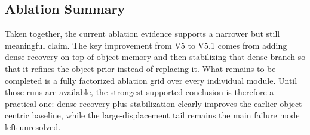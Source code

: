 \subsection{Ablation Summary}

Taken together, the current ablation evidence supports a narrower but still meaningful claim. The key improvement from V5 to V5.1 comes from adding dense recovery on top of object memory and then stabilizing that dense branch so that it refines the object prior instead of replacing it. What remains to be completed is a fully factorized ablation grid over every individual module. Until those runs are available, the strongest supported conclusion is therefore a practical one: dense recovery plus stabilization clearly improves the earlier object-centric baseline, while the large-displacement tail remains the main failure mode left unresolved.
